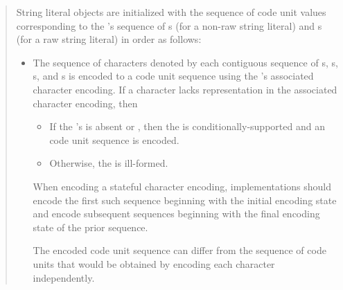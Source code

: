 \documentclass{wg21}
\begin{document}
    \begin{quote}

        String literal objects are initialized with
        the sequence of code unit values
        corresponding to the 's sequence of
        s (for a non-raw string literal) and
        s (for a raw string literal)
        in order as follows:
        \begin{itemize}
            \item
            The sequence of characters denoted by each contiguous sequence of
            s,
            s,
            s, and
            s
            is encoded to a code unit sequence
            using the 's associated character encoding.
            If a character lacks representation in the associated character encoding, then 
            \begin{removedblock}
                \begin{itemize}
                    \item
                    If the 's 
                    is absent or ,
                    then the  is conditionally-supported and
                    an
                    code unit sequence is encoded.
                    \item
                    Otherwise, the  is ill-formed.
                \end{itemize}
            \end{removedblock}
            When encoding a stateful character encoding,
            implementations should encode the first such sequence
            beginning with the initial encoding state and
            encode subsequent sequences
            beginning with the final encoding state of the prior sequence.
            \begin{note}
                The encoded code unit sequence can differ from
                the sequence of code units that would be obtained by
                encoding each character independently.
            \end{note}

\end{itemize}
\end{quote}
\end{document}
